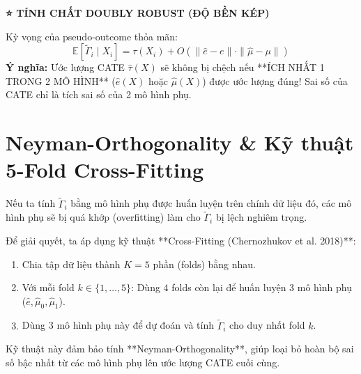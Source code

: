 \begin{mdframed}[linecolor=lazadaorange,backgroundcolor=codebg,linewidth=1.5pt,roundcorner=5pt]
\textbf{⭐ TÍNH CHẤT DOUBLY ROBUST (ĐỘ BỀN KÉP)}

Kỳ vọng của pseudo-outcome thỏa mãn:
\begin{equation}
    \mathbb{E}[\tilde{\Gamma}_i \mid X_i] = \tau(X_i) + O\left(\|\hat{e} - e\| \cdot \|\hat{\mu} - \mu\|\right)
\end{equation}
\textbf{Ý nghĩa:} Ước lượng CATE $\hat{\tau}(X)$ sẽ không bị chệch nếu **ÍCH NHẤT 1 TRONG 2 MÔ HÌNH** ($\hat{e}(X)$ hoặc $\hat{\mu}(X)$) được ước lượng đúng! Sai số của CATE chỉ là tích sai số của 2 mô hình phụ.
\end{mdframed}

\section{Neyman-Orthogonality \& Kỹ thuật 5-Fold Cross-Fitting}

Nếu ta tính $\tilde{\Gamma}_i$ bằng mô hình phụ được huấn luyện trên chính dữ liệu đó, các mô hình phụ sẽ bị quá khớp (overfitting) làm cho $\tilde{\Gamma}_i$ bị lệch nghiêm trọng.

Để giải quyết, ta áp dụng kỹ thuật **Cross-Fitting (Chernozhukov et al. 2018)**:
\begin{enumerate}
    \item Chia tập dữ liệu thành $K = 5$ phần (folds) bằng nhau.
    \item Với mỗi fold $k \in \{1, \dots, 5\}$: Dùng $4$ folds còn lại để huấn luyện 3 mô hình phụ ($\hat{e}, \hat{\mu}_0, \hat{\mu}_1$).
    \item Dùng 3 mô hình phụ này để dự đoán và tính $\tilde{\Gamma}_i$ cho duy nhất fold $k$.
\end{enumerate}

Kỹ thuật này đảm bảo tính **Neyman-Orthogonality**, giúp loại bỏ hoàn bộ sai số bậc nhất từ các mô hình phụ lên ước lượng CATE cuối cùng.
